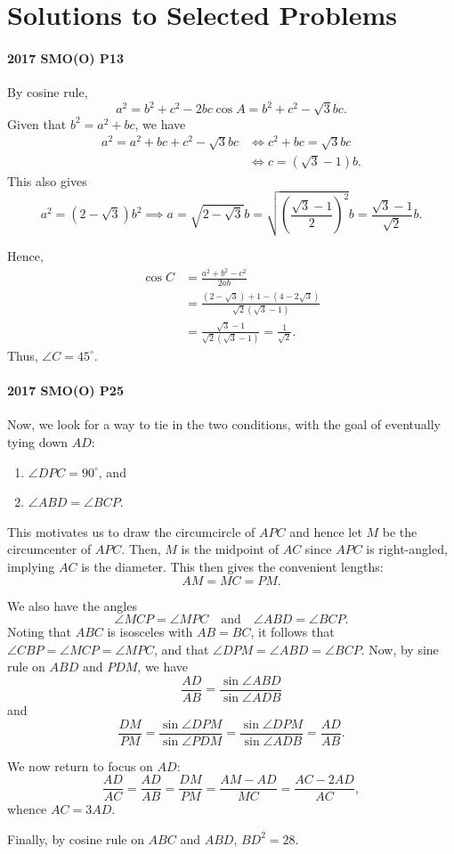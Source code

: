 \documentclass[../jarvis.tex]{subfiles}
\begin{document}
\section{Solutions to Selected Problems}
\paragraph{2017 SMO(O) P13} By cosine rule, 
$$a^2=b^2+c^2-2bc\cos{A}=b^2+c^2-\sqrt{3}bc.$$
Given that $b^2=a^2+bc$, we have
\begin{align*}
    a^2=a^2+bc+c^2-\sqrt{3}bc &\iff c^2+bc=\sqrt{3}bc \\
    &\iff c=(\sqrt{3}-1)b. 
\end{align*}
This also gives $$a^2=(2-\sqrt{3})b^2 \implies a=\sqrt{2-\sqrt{3}}b=\sqrt{\left(\frac{\sqrt{3}-1}{2}\right)^2}b=\frac{\sqrt{3}-1}{\sqrt{2}}b.$$

Hence, \begin{align*}
    \cos{C}&=\frac{a^2+b^2-c^2}{2ab} \\
        &=\frac{(2-\sqrt{3})+1-(4-2\sqrt{3})}{\sqrt{2}(\sqrt{3}-1)} \\
        &=\frac{\sqrt{3}-1}{\sqrt{2}(\sqrt{3}-1)}=\frac{1}{\sqrt{2}}.
\end{align*}
Thus, $\angle C=\boxed{45^{\circ}}$.

\paragraph{2017 SMO(O) P25}
Now, we look for a way to tie in the two conditions, with the goal of eventually tying down $AD$:
\begin{enumerate}
    \item $\angle DPC=90^{\circ}$, and
    \item $\angle ABD=\angle BCP$.
\end{enumerate}
This motivates us to draw the circumcircle of $APC$ and hence let $M$ be the circumcenter of $APC$. Then, $M$ is the midpoint of $AC$ since $APC$ is right-angled, implying $AC$ is the diameter. This then gives the convenient lengths:
$$AM=MC=PM.$$

We also have the angles $$\angle MCP=\angle MPC\quad\text{and}\quad \angle ABD=\angle BCP.$$
Noting that $ABC$ is isosceles with $AB=BC$, it follows that $\angle CBP=\angle MCP=\angle MPC$, and that $\angle DPM=\angle ABD=\angle BCP$. Now, by sine rule on $ABD$ and $PDM$, we have
$$\frac{AD}{AB}=\frac{\sin{\angle ABD}}{\sin{\angle ADB}}$$
and 
$$\frac{DM}{PM}=\frac{\sin{\angle DPM}}{\sin{\angle PDM}}=\frac{\sin{\angle DPM}}{\sin{\angle ADB}}=\frac{AD}{AB}.$$

We now return to focus on $AD$:
$$\frac{AD}{AC}=\frac{AD}{AB}=\frac{DM}{PM}=\frac{AM-AD}{MC}=\frac{AC-2AD}{AC},$$
whence $AC=3AD$.

Finally, by cosine rule on $ABC$ and $ABD$, $BD^2=\boxed{28}.$
\end{document}
